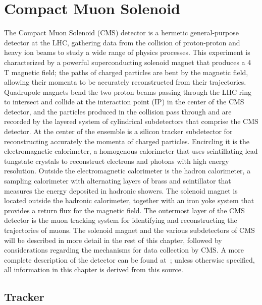 \section{Compact Muon Solenoid\label{sec:cms}}

The Compact Muon Solenoid (CMS) detector is a hermetic general-purpose detector at the LHC, gathering data from the collision of proton-proton and heavy ion beams to study a wide range of physics processes. This experiment is characterized by a powerful superconducting solenoid magnet that produces a 4 T magnetic field; the paths of charged particles are bent by the magnetic field, allowing their momenta to be accurately reconstructed from their trajectories. Quadrupole magnets bend the two proton beams passing through the LHC ring to intersect and collide at the interaction point (IP) in the center of the CMS detector, and the particles produced in the collision pass through and are recorded by the layered system of cylindrical subdetectors that comprise the CMS detector. At the center of the ensemble is a silicon tracker subdetector for reconstructing accurately the momenta of charged particles. Encircling it is the electromagnetic calorimeter, a homogenous calorimeter that uses scintillating lead tungstate crystals to reconstruct electrons and photons with high energy resolution. Outside the electromagnetic calorimeter is the hadron calorimeter, a sampling calorimeter with alternating layers of brass and scintillator that measures the energy deposited in hadronic showers. The solenoid magnet is located outside the hadronic calorimeter, together with an iron yoke system that provides a return flux for the magnetic field. The outermost layer of the CMS detector is the muon tracking system for identifying and reconstructing the trajectories of muons. The solenoid magnet and the various subdetectors of CMS will be described in more detail in the rest of this chapter, followed by considerations regarding the mechanisms for data collection by CMS. A more complete description of the detector can be found at~\cite{1748-0221-3-08-S08004}; unless otherwise specified, all information in this chapter is derived from this source.

\subsection{Tracker\label{sec:cms-tracker}}

